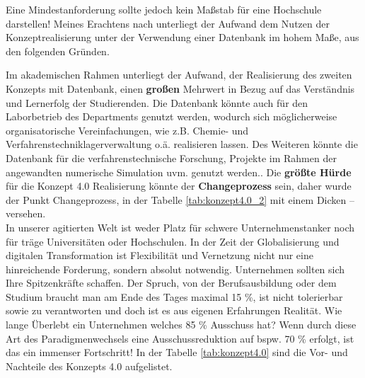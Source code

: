 %

Eine Mindestanforderung sollte jedoch kein Maßstab für eine Hochschule darstellen! Meines Erachtens nach unterliegt der Aufwand dem Nutzen der Konzeptrealisierung unter der Verwendung einer Datenbank im hohem Maße, aus den folgenden Gründen. 

Im akademischen Rahmen unterliegt der Aufwand, der Realisierung des zweiten Konzepts mit Datenbank, einen \textbf{großen} Mehrwert in Bezug auf das Verständnis und Lernerfolg der Studierenden. Die Datenbank könnte auch für den Laborbetrieb des Departments genutzt werden, wodurch sich möglicherweise organisatorische Vereinfachungen, wie z.B. Chemie- und Verfahrenstechniklagerverwaltung o.ä. realisieren lassen. Des Weiteren könnte die Datenbank für die verfahrenstechnische Forschung, Projekte im Rahmen der angewandten numerische Simulation uvm. genutzt werden.. Die \textbf{größte Hürde} für die Konzept 4.0 Realisierung könnte der \textbf{Changeprozess} sein, daher wurde der Punkt Changeprozess, in der Tabelle \ref{tab:konzept4.0_2} mit einem Dicken -- versehen.\\

In unserer agitierten Welt ist weder Platz für schwere Unternehmenstanker noch für träge Universitäten oder Hochschulen. In der Zeit der Globalisierung und digitalen Transformation ist Flexibilität und Vernetzung nicht nur eine hinreichende Forderung, sondern absolut notwendig. Unternehmen sollten sich Ihre Spitzenkräfte schaffen. Der Spruch, \glqq von der Berufsausbildung oder dem Studium braucht man am Ende des Tages maximal 15 \%\grqq , ist nicht tolerierbar sowie zu verantworten und doch ist es aus eigenen Erfahrungen Realität. Wie lange Überlebt ein Unternehmen welches 85 \% Ausschuss hat? Wenn durch diese Art des Paradigmenwechsels eine Ausschussreduktion auf bspw. 70 \% erfolgt, ist das ein immenser Fortschritt! 
In der Tabelle \ref{tab:konzept4.0} sind die Vor- und Nachteile des Konzepts 4.0 aufgelistet.\\




